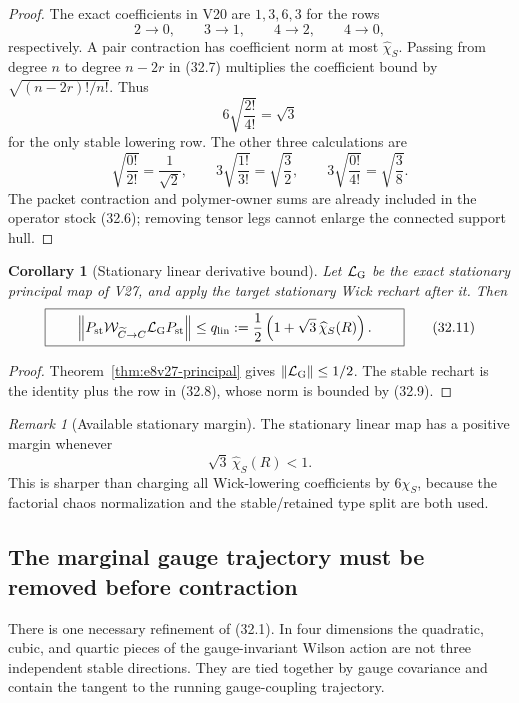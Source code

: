 \documentclass[11pt,oneside]{book}
\newtheorem{corollary}[theorem]{Corollary}
\theoremstyle{definition}
\theoremstyle{remark}
\newtheorem{remark}[theorem]{Remark}
\begin{document}
\begin{proof}
The exact coefficients in V20 are \(1,3,6,3\) for the rows
\[
 2\to0,\qquad3\to1,\qquad4\to2,\qquad4\to0,
\]
respectively.  A pair contraction has coefficient norm at most
\(\widehat\chi_S\).  Passing from degree \(n\) to degree \(n-2r\)
in (32.7) multiplies the coefficient bound by
\(\sqrt{(n-2r)!/n!}\).  Thus
\[
 6\sqrt{\frac{2!}{4!}}=\sqrt3
\]
for the only stable lowering row.  The other three calculations are
\[
 \sqrt{\frac{0!}{2!}}=\frac1{\sqrt2},\qquad
 3\sqrt{\frac{1!}{3!}}=\sqrt{\frac32},\qquad
 3\sqrt{\frac{0!}{4!}}=\sqrt{\frac38}.
\]
The packet contraction and polymer-owner sums are already included
in the operator stock (32.6); removing tensor legs cannot enlarge
the connected support hull.
\end{proof}

\begin{corollary}[Stationary linear derivative bound]
\label{cor:e8v32-linear}
Let \({\cal L}_{\rm G}\) be the exact stationary principal map of
V27, and apply the target stationary Wick rechart after it.  Then
\[
\boxed{\qquad
 \left\|
 P_{\rm st}{\cal W}_{\widetilde C\to C}
 {\cal L}_{\rm G}P_{\rm st}
 \right\|
 \leq
 q_{\rm lin}:=
 \frac12\left(1+\sqrt3\,\widehat\chi_S(R)\right).
\qquad}                                                           \tag{32.11}
\]
\end{corollary}

\begin{proof}
Theorem~\ref{thm:e8v27-principal} gives
\(\|{\cal L}_{\rm G}\|\leq1/2\).  The stable rechart is the identity
plus the row in (32.8), whose norm is bounded by (32.9).
\end{proof}

\begin{remark}[Available stationary margin]
\label{rem:e8v32-linear-margin}
The stationary linear map has a positive margin whenever
\[
                         \sqrt3\,\widehat\chi_S(R)<1.             \tag{32.12}
\]
This is sharper than charging all Wick-lowering coefficients by
\(6\chi_S\), because the factorial chaos normalization and the
stable/retained type split are both used.
\end{remark}

\subsection{The marginal gauge trajectory must be removed before contraction}

There is one necessary refinement of (32.1).  In four dimensions the
quadratic, cubic, and quartic pieces of the gauge-invariant Wilson
action are not three independent stable directions.  They are tied
together by gauge covariance and contain the tangent to the running
gauge-coupling trajectory.
\end{document}
